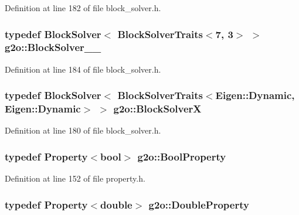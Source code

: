 Definition at line 182 of file block\+\_\+solver.\+h.

\subsubsection[{\texorpdfstring{Block\+Solver\+\_\+7\+\_\+3}{BlockSolver_7_3}}]{\setlength{\rightskip}{0pt plus 5cm}typedef {\bf Block\+Solver}$<$ {\bf Block\+Solver\+Traits}$<$7, 3$>$ $>$ {\bf g2o\+::\+Block\+Solver\+\_\+\_}}\hypertarget{namespaceg2o_a83b509c02a1333991cbb0c04d3ff7beb}{}\label{namespaceg2o_a83b509c02a1333991cbb0c04d3ff7beb}


Definition at line 184 of file block\+\_\+solver.\+h.

\subsubsection[{\texorpdfstring{Block\+SolverX}{BlockSolverX}}]{\setlength{\rightskip}{0pt plus 5cm}typedef {\bf Block\+Solver}$<$ {\bf Block\+Solver\+Traits}$<$Eigen\+::\+Dynamic, Eigen\+::\+Dynamic$>$ $>$ {\bf g2o\+::\+Block\+SolverX}}\hypertarget{namespaceg2o_a8d3214273331c25cbb5d5266770e6c12}{}\label{namespaceg2o_a8d3214273331c25cbb5d5266770e6c12}


Definition at line 180 of file block\+\_\+solver.\+h.

\subsubsection[{\texorpdfstring{Bool\+Property}{BoolProperty}}]{\setlength{\rightskip}{0pt plus 5cm}typedef {\bf Property}$<$bool$>$ {\bf g2o\+::\+Bool\+Property}}\hypertarget{namespaceg2o_a28e624fedcafeb2b049be2930421071f}{}\label{namespaceg2o_a28e624fedcafeb2b049be2930421071f}


Definition at line 152 of file property.\+h.

\subsubsection[{\texorpdfstring{Double\+Property}{DoubleProperty}}]{\setlength{\rightskip}{0pt plus 5cm}typedef {\bf Property}$<$double$>$ {\bf g2o\+::\+Double\+Property}}\hypertarget{namespaceg2o_a9b4e25cbdaf9d69afa4431d6af6d7bed}{}\label{namespaceg2o_a9b4e25cbdaf9d69afa4431d6af6d7bed}


